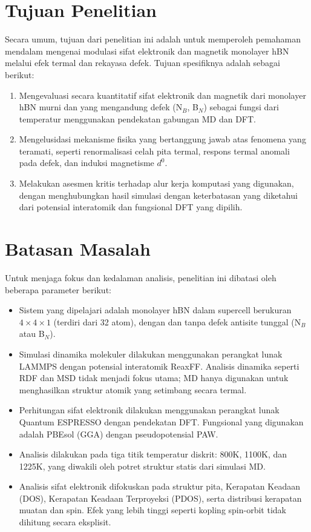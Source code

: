 \section{Tujuan Penelitian}
Secara umum, tujuan dari penelitian ini adalah untuk memperoleh pemahaman mendalam mengenai modulasi sifat elektronik dan magnetik monolayer hBN melalui efek termal dan rekayasa defek. Tujuan spesifiknya adalah sebagai berikut:
\begin{enumerate}
    \item Mengevaluasi secara kuantitatif sifat elektronik dan magnetik dari monolayer hBN murni dan yang mengandung defek (N$_B$, B$_N$) sebagai fungsi dari temperatur menggunakan pendekatan gabungan MD dan DFT.
    \item Mengelusidasi mekanisme fisika yang bertanggung jawab atas fenomena yang teramati, seperti renormalisasi celah pita termal, respons termal anomali pada defek, dan induksi magnetisme $d^0$.
    \item Melakukan asesmen kritis terhadap alur kerja komputasi yang digunakan, dengan menghubungkan hasil simulasi dengan keterbatasan yang diketahui dari potensial interatomik dan fungsional DFT yang dipilih.
\end{enumerate}

\section{Batasan Masalah}
Untuk menjaga fokus dan kedalaman analisis, penelitian ini dibatasi oleh beberapa parameter berikut:
\begin{itemize}
    \item Sistem yang dipelajari adalah monolayer hBN dalam supercell berukuran $4 \times 4 \times 1$ (terdiri dari 32 atom), dengan dan tanpa defek antisite tunggal (N$_B$ atau B$_N$).
    \item Simulasi dinamika molekuler dilakukan menggunakan perangkat lunak LAMMPS dengan potensial interatomik ReaxFF. Analisis dinamika seperti RDF dan MSD tidak menjadi fokus utama; MD hanya digunakan untuk menghasilkan struktur atomik yang setimbang secara termal.
    \item Perhitungan sifat elektronik dilakukan menggunakan perangkat lunak Quantum ESPRESSO dengan pendekatan DFT. Fungsional yang digunakan adalah PBEsol (GGA) dengan pseudopotensial PAW.
    \item Analisis dilakukan pada tiga titik temperatur diskrit: 800K, 1100K, dan 1225K, yang diwakili oleh potret struktur statis dari simulasi MD.
    \item Analisis sifat elektronik difokuskan pada struktur pita, Kerapatan Keadaan (DOS), Kerapatan Keadaan Terproyeksi (PDOS), serta distribusi kerapatan muatan dan spin. Efek yang lebih tinggi seperti kopling spin-orbit tidak dihitung secara eksplisit.
\end{itemize}


